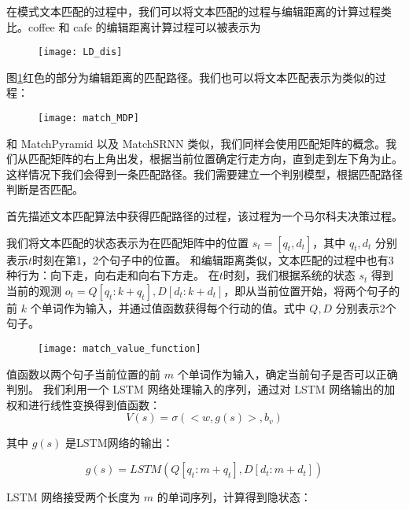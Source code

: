 在模式文本匹配的过程中，我们可以将文本匹配的过程与编辑距离\citep{website:edit_dis}的计算过程类比。coffee 和 cafe 的编辑距离计算过程可以被表示为

\begin{figure}[H]
    \centering
    \texttt{[image: LD\_dis]}
    \label{fig:LD_dis}
\end{figure}

图\ref{fig:LD_dis}红色的部分为编辑距离的匹配路径。我们也可以将文本匹配表示为类似的过程：

\begin{figure}[!htbp]
    \centering
    \texttt{[image: match\_MDP]}
    \label{fig:match_MDP}
\end{figure}

和 MatchPyramid 以及 MatchSRNN 类似，我们同样会使用匹配矩阵的概念。我们从匹配矩阵的右上角出发，根据当前位置确定行走方向，直到走到左下角为止。这样情况下我们会得到一条匹配路径。我们需要建立一个判别模型，根据匹配路径判断是否匹配。

首先描述文本匹配算法中获得匹配路径的过程，该过程为一个马尔科夫决策过程。

我们将文本匹配的状态表示为在匹配矩阵中的位置 $s_t = [q_{t}, d_{t}]$，其中 $q_{t}, d_{t}$ 分别表示$t$时刻在第1，2个句子中的位置。
和编辑距离类似，文本匹配的过程中也有3种行为：向下走，向右走和向右下方走。
在$t$时刻，我们根据系统的状态 $s_t$ 得到当前的观测 $o_t = Q [q_{t}:k+q_{t}], D [d_{t}:k+d_{t}]$，即从当前位置开始，将两个句子的前 $k$ 个单词作为输入，并通过值函数获得每个行动的值。式中 $Q, D$ 分别表示2个句子。

\begin{figure}[!htbp]
    \centering
    \texttt{[image: match\_value\_function]}
    \label{fig:value_function_input}
\end{figure}

值函数以两个句子当前位置的前 $m$ 个单词作为输入，确定当前句子是否可以正确判别。
我们利用一个 LSTM 网络处理输入的序列，通过对 LSTM 网络输出的加权和进行线性变换得到值函数：
$$
V(s) = \sigma(<w, g(s)>, b_v)
$$

其中 $g(s)$ 是LSTM网络的输出：

$$
g(s) = LSTM(Q[q_{t}:m+q_{t}], D [d_{t}:m+d_{t}])
$$

LSTM 网络接受两个长度为 $m$ 的单词序列，计算得到隐状态：

